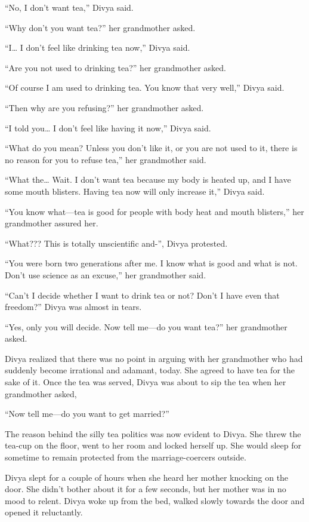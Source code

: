 “No, I don't want tea,” Divya said.

“Why don't you want tea?” her grandmother asked.

“I… I don't feel like drinking tea now,” Divya said.

“Are you not used to drinking tea?” her grandmother asked.

“Of course I am used to drinking tea. You know that very well,” Divya said.

“Then why are you refusing?” her grandmother asked.

“I told you… I don't feel like having it now,” Divya said.

“What do you mean? Unless you don't like it, or you are not used to it, there is
no reason for you to refuse tea,” her grandmother said.

“What the… Wait. I don't want tea because my body is heated up, and I have
some mouth blisters. Having tea now will only increase it,” Divya said.

“You know what—tea is good for people with body heat and mouth blisters,” her
grandmother assured her.

“What??? This is totally unscientific and-”, Divya protested.

“You were born two generations after me. I know what is good and what is not.
Don't use science as an excuse,” her grandmother said.

“Can't I decide whether I want to drink tea or not? Don't I have even that
freedom?” Divya was almost in tears.

“Yes, only you will decide. Now tell me—do you want tea?” her grandmother
asked.

Divya realized that there was no point in arguing with her grandmother who had
suddenly become irrational and adamant, today. She agreed to have tea for the
sake of it. Once the tea was served, Divya was about to sip the tea when her
grandmother asked,

“Now tell me—do you want to get married?”

The reason behind the silly tea politics was now evident to Divya. She threw the
tea-cup on the floor, went to her room and locked herself up. She would sleep
for sometime to remain protected from the marriage-coercers outside.

Divya slept for a couple of hours when she heard her mother knocking on the
door. She didn't bother about it for a few seconds, but her mother was in no mood
to relent. Divya woke up from the bed, walked slowly towards the door and opened
it reluctantly.


